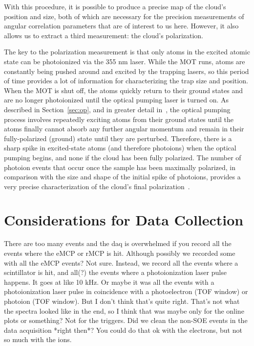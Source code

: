 

With this procedure, it is possible to produce a precise map of the cloud's position and size, both of which are necessary for the precision measurements of angular correlation parameters that are of interest to us here.  However, it also allows us to extract a third measurement:  the cloud's polarization.

The key to the polarization measurement is that only atoms in the excited atomic state can be photoionized via the 355 nm laser.  While the MOT runs, atoms are constantly being pushed around and excited by the trapping lasers, so this period of time provides a lot of information for characterizing the trap size and position.  When the MOT is shut off, the atoms quickly return to their ground states and are no longer photoionized until the optical pumping laser is turned on.  As described in Section~\ref{sec:op}, and in greater detail in~\cite{ben_OP}, the optical pumping process involves repeatedly exciting atoms from their ground states until the atoms finally cannot absorb any further angular momentum and remain in their fully-polarized (ground) state until they are perturbed.  Therefore, there is a sharp spike in excited-state atoms (and therefore photoions) when the optical pumping begins, and none if 
the cloud has been fully polarized.  The number of photoion events that occur once the sample has been maximally polarized, in comparison with the size and shape of the initial spike of photoions, provides a very precise characterization of the cloud's final polarization~\cite{ben_OP}.


\section{Considerations for Data Collection}
\label{sec:dataconsiderations}
There are too many events and the daq is overwhelmed if you record all the events where the eMCP or rMCP is hit.  Although possibly we recorded some with all the eMCP events?  Not sure.
Instead, we record all the events where a scintillator is hit, and all(?) the events where a photoionization laser pulse happens.  It goes at like 10 kHz.  Or maybe it was all the events with a photoionization laser pulse in coincidence with a photoelectron (TOF window) or photoion (TOF window).  But I don't think that's quite right.  That's not what the spectra looked like in the end, so I think that was maybe only for the online plots or something?  Not for the triggers.  Did we clean the non-SOE events in the data acquisition *right then*?  You could do that ok with the electrons, but not so much with the ions.  
\note[tag]{}

